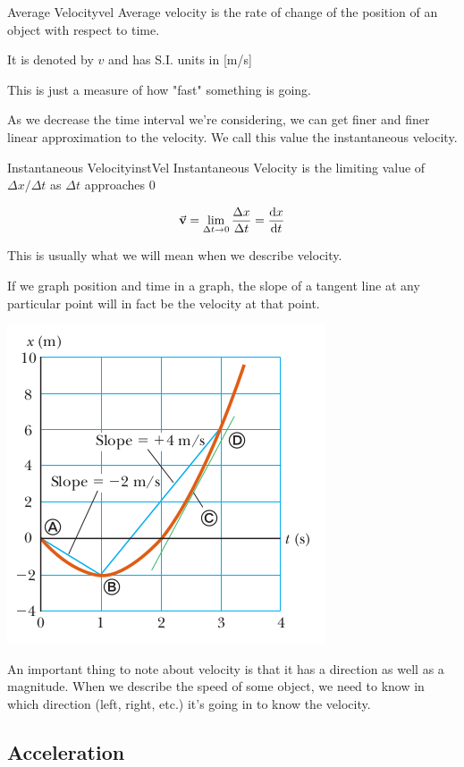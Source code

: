 \documentclass{report}
\begin{document}
\begin{mytheo}{Average Velocity}{vel}
    Average velocity is the rate of change of the position of an object with respect to time.
    
    It is denoted by $v$ and has S.I. units in [m/s]
\end{mytheo}

This is just a measure of how "fast" something is going.


As we decrease the time interval we're considering, we can get finer and finer linear approximation to the velocity. We call this value the instantaneous velocity.

\begin{mytheo}{Instantaneous Velocity}{instVel}
    Instantaneous Velocity is the limiting value of $\Delta x / \Delta t$ as $\Delta t$ approaches 0
    
    $$\va{v} = \lim_{\Delta t \to 0}\frac{\Delta x}{\Delta t} = \dv{x}{t}$$
\end{mytheo}

This is usually what we will mean when we describe velocity.

If we graph position and time in a graph, the slope of a tangent line at any particular point will in fact be the velocity at that point.

\includegraphics[scale=0.5]{velocity.png}


An important thing to note about velocity is that it has a direction as well as a magnitude. When we describe the speed of some object, we need to know in which direction (left, right, etc.) it's going in to know the velocity.


\subsection{Acceleration}
\end{document}
